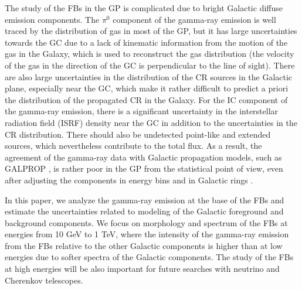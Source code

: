 The study of the FBs in the GP is complicated due to bright Galactic diffuse emission components.
The $\pi^0$ component of the gamma-ray emission is well traced by the distribution of gas in most of the GP,
but it has large uncertainties towards the GC due to a lack of kinematic information from the motion of the gas in the 
Galaxy, which is used to reconstruct the gas distribution
(the velocity of the gas in the direction of the GC is perpendicular to the line of sight).
There are also large uncertainties in the distribution of the CR sources in the Galactic plane, especially near the GC,
which make it rather difficult to predict a priori 
the distribution of the propagated CR in the Galaxy.
For the IC component of the gamma-ray emission, 
there is a significant uncertainty in the interstellar radiation field (ISRF) density near the GC \citep[e.g.,][]{2017ApJ...846...67P} in addition to 
the uncertainties in the CR distribution.
There should also be undetected point-like and extended sources, which nevertheless contribute to the total flux.
As a result, the agreement of the gamma-ray data with Galactic propagation models, such as GALPROP \citep{2007ARNPS..57..285S}, 
is rather poor in the GP from the statistical point of view, even after adjusting the components in energy bins and in Galactic rings
\citep[e.g.,][]{2012ApJ...750....3A, 2017ApJ...840...43A}.

In this paper, we analyze the gamma-ray emission at the base of the FBs and 
estimate the uncertainties %
related to modeling of the Galactic foreground and background components.
We focus on morphology and spectrum of the FBs at energies from 10 GeV to 1 TeV,
where the intensity of the gamma-ray emission from the FBs 
relative to the other Galactic components
is higher than at low energies due to softer spectra of the Galactic components.
The study of the FBs at high energies will be also important for future searches with neutrino and Cherenkov telescopes.

